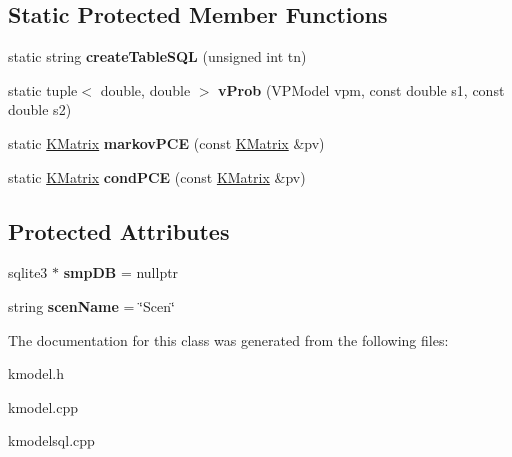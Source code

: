 \subsection*{Static Protected Member Functions}
\begin{DoxyCompactItemize}
\item 
\hypertarget{class_k_base_1_1_model_a4f9616242374d83dec4fadb954a6af67}{static string {\bfseries create\-Table\-S\-Q\-L} (unsigned int tn)}\label{class_k_base_1_1_model_a4f9616242374d83dec4fadb954a6af67}

\item 
\hypertarget{class_k_base_1_1_model_a94bb7e9c4b5cd9c5de1cab7abec12e70}{static tuple$<$ double, double $>$ {\bfseries v\-Prob} (V\-P\-Model vpm, const double s1, const double s2)}\label{class_k_base_1_1_model_a94bb7e9c4b5cd9c5de1cab7abec12e70}

\item 
\hypertarget{class_k_base_1_1_model_a7d265a8cd6b8c42fa933626ead61e70d}{static \hyperlink{class_k_base_1_1_k_matrix}{K\-Matrix} {\bfseries markov\-P\-C\-E} (const \hyperlink{class_k_base_1_1_k_matrix}{K\-Matrix} \&pv)}\label{class_k_base_1_1_model_a7d265a8cd6b8c42fa933626ead61e70d}

\item 
\hypertarget{class_k_base_1_1_model_a8e920c4a2ffc517e171cc39d60feb5f1}{static \hyperlink{class_k_base_1_1_k_matrix}{K\-Matrix} {\bfseries cond\-P\-C\-E} (const \hyperlink{class_k_base_1_1_k_matrix}{K\-Matrix} \&pv)}\label{class_k_base_1_1_model_a8e920c4a2ffc517e171cc39d60feb5f1}

\end{DoxyCompactItemize}
\subsection*{Protected Attributes}
\begin{DoxyCompactItemize}
\item 
\hypertarget{class_k_base_1_1_model_a41d171a405093172d905ab3351be3a38}{sqlite3 $\ast$ {\bfseries smp\-D\-B} = nullptr}\label{class_k_base_1_1_model_a41d171a405093172d905ab3351be3a38}

\item 
\hypertarget{class_k_base_1_1_model_a73e69311b9afd8c8b0c4c43bfd07d994}{string {\bfseries scen\-Name} = \char`\"{}Scen\char`\"{}}\label{class_k_base_1_1_model_a73e69311b9afd8c8b0c4c43bfd07d994}

\end{DoxyCompactItemize}


The documentation for this class was generated from the following files\-:\begin{DoxyCompactItemize}
\item 
kmodel.\-h\item 
kmodel.\-cpp\item 
kmodelsql.\-cpp\end{DoxyCompactItemize}
